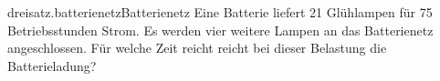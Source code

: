 \begin{exercise}{dreisatz.batterienetz}{Batterienetz}
  \ifproblem\problem
    Eine Batterie liefert 21 Glühlampen für 75 Betriebsstunden Strom. Es werden
    vier weitere Lampen an das Batterienetz angeschlossen. Für welche Zeit reicht
    reicht bei dieser Belastung die Batterieladung?
  \fi
\end{exercise}

